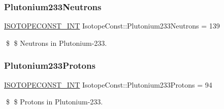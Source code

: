 \subsubsection{\texorpdfstring{Plutonium233\+Neutrons}{Plutonium233Neutrons}}
{\footnotesize\ttfamily \mbox{\hyperlink{group___isotope_const-_macros_ga5f18360b3e99483a35c32d789e62621c}{I\+S\+O\+T\+O\+P\+E\+C\+O\+N\+S\+T\+\_\+\+I\+NT}} Isotope\+Const\+::\+Plutonium233\+Neutrons = 139}

\$ \$ Neutrons in Plutonium-\/233. \mbox{\label{group___isotope_const-_plutonium-_pu233_ga7566791d02602706dc2bd27429c2dec0}} 
\subsubsection{\texorpdfstring{Plutonium233\+Protons}{Plutonium233Protons}}
{\footnotesize\ttfamily \mbox{\hyperlink{group___isotope_const-_macros_ga5f18360b3e99483a35c32d789e62621c}{I\+S\+O\+T\+O\+P\+E\+C\+O\+N\+S\+T\+\_\+\+I\+NT}} Isotope\+Const\+::\+Plutonium233\+Protons = 94}

\$ \$ Protons in Plutonium-\/233. 